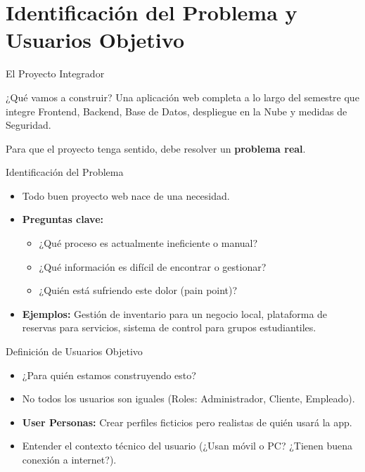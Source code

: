 \documentclass{beamer}
\begin{document}
\section{Identificación del Problema y Usuarios Objetivo}

\begin{frame}{El Proyecto Integrador}
    \begin{block}{¿Qué vamos a construir?}
        Una aplicación web completa a lo largo del semestre que integre Frontend, Backend, Base de Datos, despliegue en la Nube y medidas de Seguridad.
    \end{block}
    \vspace{0.5cm}
    Para que el proyecto tenga sentido, debe resolver un \textbf{problema real}.
\end{frame}

\begin{frame}{Identificación del Problema}
    \begin{itemize}
        \item Todo buen proyecto web nace de una necesidad.
        \item \textbf{Preguntas clave:}
        \begin{itemize}
            \item ¿Qué proceso es actualmente ineficiente o manual?
            \item ¿Qué información es difícil de encontrar o gestionar?
            \item ¿Quién está sufriendo este dolor (pain point)?
        \end{itemize}
        \item \textbf{Ejemplos:} Gestión de inventario para un negocio local, plataforma de reservas para servicios, sistema de control para grupos estudiantiles.
    \end{itemize}
\end{frame}

\begin{frame}{Definición de Usuarios Objetivo}
    \begin{itemize}
        \item ¿Para quién estamos construyendo esto?
        \item No todos los usuarios son iguales (Roles: Administrador, Cliente, Empleado).
        \item \textbf{User Personas:} Crear perfiles ficticios pero realistas de quién usará la app.
        \item Entender el contexto técnico del usuario (¿Usan móvil o PC? ¿Tienen buena conexión a internet?).
    \end{itemize}
\end{frame}
\end{document}
